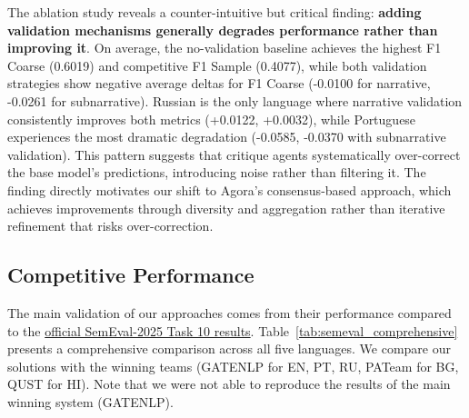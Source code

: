 The ablation study reveals a counter-intuitive but critical finding: \textbf{adding validation mechanisms generally degrades performance rather than improving it}. On average, the no-validation baseline achieves the highest F1 Coarse (0.6019) and competitive F1 Sample (0.4077), while both validation strategies show negative average deltas for F1 Coarse (-0.0100 for narrative, -0.0261 for subnarrative). Russian is the only language where narrative validation consistently improves both metrics (+0.0122, +0.0032), while Portuguese experiences the most dramatic degradation (-0.0585, -0.0370 with subnarrative validation). This pattern suggests that critique agents systematically over-correct the base model's predictions, introducing noise rather than filtering it. The finding directly motivates our shift to Agora's consensus-based approach, which achieves improvements through diversity and aggregation rather than iterative refinement that risks over-correction.

\subsection{Competitive Performance}

The main validation of our approaches comes from their performance compared to the \href{https://propaganda.math.unipd.it/semeval2025task10/leaderboardv3.html}{official SemEval-2025 Task 10 results}. Table~\ref{tab:semeval_comprehensive} presents a comprehensive comparison across all five languages. We compare our solutions with the winning teams (GATENLP for EN, PT, RU, PATeam for BG, QUST for HI). Note that we were not able to reproduce the results of the main winning system (GATENLP). %

